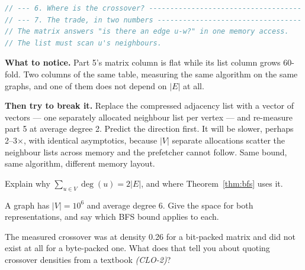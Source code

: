 \begin{lab}
\begin{lstlisting}[language=C++]
// --- 6. Where is the crossover? ------------------------------------
// --- 7. The trade, in two numbers ----------------------------------
// The matrix answers "is there an edge u-w?" in one memory access.
// The list must scan u's neighbours.
\end{lstlisting}

\textbf{What to notice.} Part 5's matrix column is flat while its list column
grows 60-fold. Two columns of the same table, measuring the same algorithm on
the same graphs, and one of them does not depend on $|E|$ at all.

\smallskip
\textbf{Then try to break it.} Replace the compressed adjacency list with a
vector of vectors --- one separately allocated neighbour list per vertex ---
and re-measure part 5 at average degree 2.
Predict the direction first. It will be slower, perhaps 2--3$\times$,
with identical asymptotics, because $|V|$ separate allocations scatter the
neighbour lists across memory and the prefetcher cannot follow. Same bound,
same algorithm, different memory layout.
\end{lab}

\begin{checkpoint}
\begin{tightnum}
  \item Explain why $\sum_{u \in V} \deg(u) = 2|E|$, and where
        Theorem~\ref{thm:bfs} uses it.
  \item A graph has $|V| = 10^{6}$ and average degree 6. Give the space for
        both representations, and say which BFS bound applies to each.
  \item The measured crossover was at density 0.26 for a bit-packed matrix and
        did not exist at all for a byte-packed one. What does that tell you
        about quoting crossover densities from a textbook \emph{(CLO-2)}?
\end{tightnum}
\end{checkpoint}

